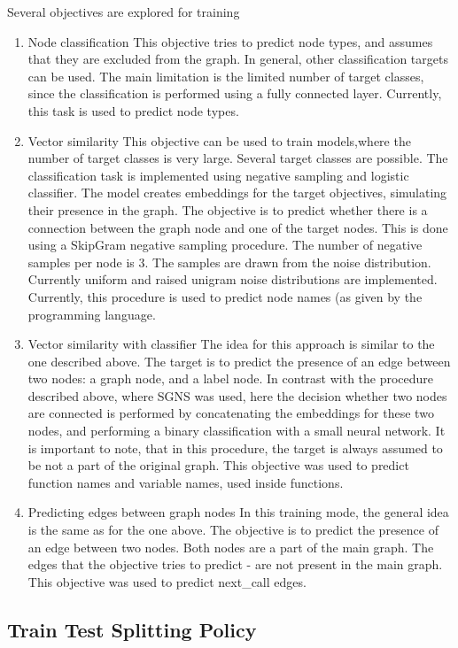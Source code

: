 \documentclass[a4paper,twoside]{article}
\begin{document}
Several objectives are explored for training 
\begin{enumerate}
    \item Node classification
    This objective tries to predict node types, and assumes that they are excluded from the graph. In general, other classification targets can be used. The main limitation is the limited number of target classes, since the classification is performed using a fully connected layer. Currently, this task is used to predict node types. 
    \item Vector similarity
    This objective can be used to train models,where the number of target classes is very large. Several target classes are possible. The classification task is implemented using negative sampling and logistic classifier. The model creates embeddings for the target objectives, simulating their presence in the graph. The objective is to predict whether there is a connection between the graph node and one of the target nodes. This is done using a SkipGram negative sampling procedure. The number of negative samples per node is 3. The samples are drawn from the noise distribution. Currently uniform and raised unigram noise distributions are implemented. Currently, this procedure is used to predict node names (as given by the programming language. 
    \item Vector similarity with classifier
    The idea for this approach is similar to the one described above. The target is to predict the presence of an edge between two nodes: a graph node, and a label node. In contrast with the procedure described above, where SGNS was used, here the decision whether two nodes are connected is performed by concatenating the embeddings for these two nodes, and performing a binary classification with a small neural network. It is important to note, that in this procedure, the target is always assumed to be not a part of the original graph. This objective was used to predict function names and variable names, used inside functions.
    \item Predicting edges between graph nodes
    In this training mode, the general idea is the same as for the one above. The objective is to predict the presence of an edge between two nodes. Both nodes are a part of the main graph. The edges that the objective tries to predict - are not present in the main graph. This objective was used to predict next_call edges.
\end{enumerate}

\subsection{Train Test Splitting Policy}
\end{document}
